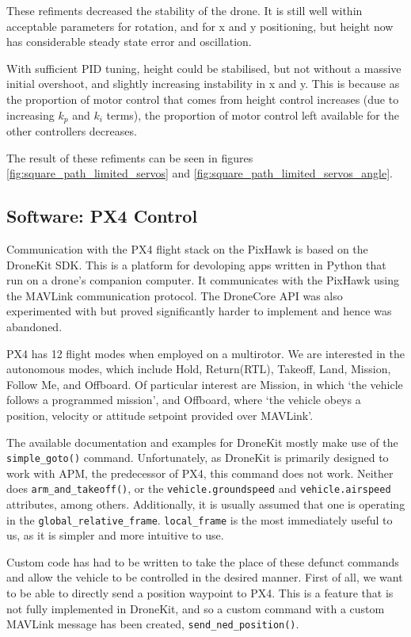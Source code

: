 \documentclass[11pt]{article}
\begin{document}
These refiments decreased the stability of the drone. It is still well within acceptable parameters for rotation, and for x and y positioning, but height now has considerable steady state error and oscillation.

With sufficient PID tuning, height could be stabilised, but not without a massive initial overshoot, and slightly increasing instability in x and y. This is because as the proportion of motor control that comes from height control increases (due to increasing $k_p$ and $k_i$ terms), the proportion of motor control left available for the other controllers decreases.

The result of these refiments can be seen in figures \ref{fig:square_path_limited_servos} and \ref{fig:square_path_limited_servos_angle}.

\subsection{Software: PX4 Control}
Communication with the PX4 flight stack on the PixHawk is based on the DroneKit SDK. This is a platform for devoloping apps written in Python that run on a drone's companion computer. It communicates with the PixHawk using the MAVLink communication protocol.\cite{dronekit} The DroneCore API was also experimented with but proved significantly harder to implement and hence was abandoned.

PX4 has 12 flight modes when employed on a multirotor. We are interested in the autonomous modes, which include Hold, Return(RTL), Takeoff, Land, Mission, Follow Me, and Offboard. Of particular interest are Mission, in which `the vehicle follows a programmed mission', and Offboard, where `the vehicle obeys a position, velocity or attitude setpoint provided over MAVLink'.\cite{PX4_user_guide}

The available documentation and examples for DroneKit mostly make use of the \lstinline[language=Python]|simple_goto()| command. Unfortunately, as DroneKit is primarily designed to work with APM, the predecessor of PX4, this command does not work. Neither does \lstinline[language=Python]|arm_and_takeoff()|, or the \lstinline|vehicle.groundspeed| and \lstinline|vehicle.airspeed| attributes, among others. Additionally, it is usually assumed that one is operating in the \lstinline|global_relative_frame|. \lstinline|local_frame| is the most immediately useful to us, as it is simpler and more intuitive to use.

Custom code has had to be written to take the place of these defunct commands and allow the vehicle to be controlled in the desired manner. First of all, we want to be able to directly send a position waypoint to PX4. This is a feature that is not fully implemented in DroneKit, and so a custom command with a custom MAVLink message has been created, \lstinline|send_ned_position()|.
\end{document}

